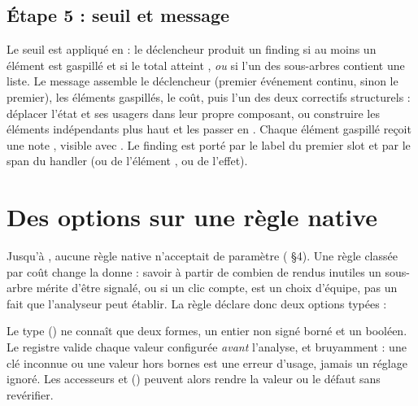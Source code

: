 \subsection{Étape 5 : seuil et message}

Le seuil est appliqué en  : le
déclencheur produit un finding si au moins un élément est gaspillé et si le total atteint
, \emph{ou} si l'un des sous-arbres contient une liste. Le message assemble le déclencheur
(premier événement continu, sinon le premier), les éléments gaspillés, le coût, puis l'un des deux
correctifs structurels : déplacer l'état et ses usagers dans leur propre composant, ou construire
les éléments indépendants plus haut et les passer en . Chaque élément gaspillé
reçoit une note , visible avec . Le finding est porté par le
label du premier slot et par le span du handler (ou de l'élément , ou de l'effet).

\section{Des options sur une règle native}
\label{sec:regles-rendu-rsc-options}

Jusqu'à , aucune règle native n'acceptait de paramètre ( §4). Une règle
classée par coût change la donne : savoir à partir de combien de rendus inutiles un sous-arbre
mérite d'être signalé, ou si un clic compte, est un choix d'équipe, pas un fait que l'analyseur
peut établir. La règle déclare donc deux options typées :


Le type  () ne connaît que deux formes,
un entier non signé borné et un booléen. Le registre valide chaque valeur configurée
\emph{avant} l'analyse, et bruyamment : une clé inconnue ou une valeur hors bornes est une erreur
d'usage, jamais un réglage ignoré. Les accesseurs  et 
() peuvent alors rendre la valeur ou le défaut sans
revérifier.

